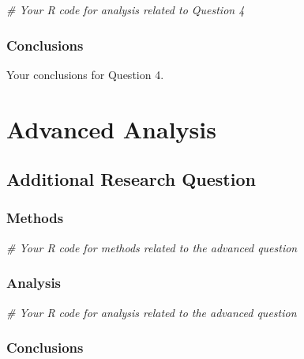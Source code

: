 \documentclass[
]{article}
\newenvironment{Shaded}{\begin{snugshade}}{\end{snugshade}}
\newcommand{\CommentTok}[1]{\textcolor[rgb]{0.56,0.35,0.01}{\textit{#1}}}
\begin{document}
\begin{Shaded}
\begin{Highlighting}[]
\CommentTok{\# Your R code for analysis related to Question 4}
\end{Highlighting}
\end{Shaded}

\subsubsection{Conclusions}\label{conclusions-4}

Your conclusions for Question 4.

\section{Advanced Analysis}\label{advanced-analysis}

\subsection{Additional Research
Question}\label{additional-research-question}

\subsubsection{Methods}\label{methods-5}

\begin{Shaded}
\begin{Highlighting}[]
\CommentTok{\# Your R code for methods related to the advanced question}
\end{Highlighting}
\end{Shaded}

\subsubsection{Analysis}\label{analysis-5}

\begin{Shaded}
\begin{Highlighting}[]
\CommentTok{\# Your R code for analysis related to the advanced question}
\end{Highlighting}
\end{Shaded}

\subsubsection{Conclusions}\label{conclusions-5}
\end{document}
